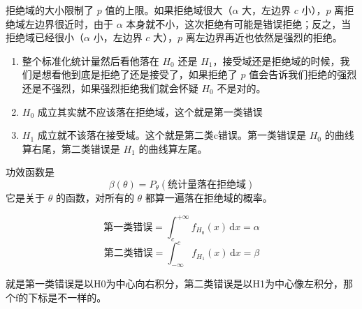 \begin{note}
    拒绝域的大小限制了 $p$ 值的上限。如果拒绝域很大（$\alpha$ 大，左边界 $c$ 小），$p$ 离拒绝域左边界很近时，由于 $\alpha$ 本身就不小，这次拒绝有可能是错误拒绝；反之，当拒绝域已经很小（$\alpha$ 小，左边界 $c$ 大），$p$ 离左边界再近也依然是强烈的拒绝。
\end{note}
\begin{dxtips}
    \begin{enumerate}
    \item[(1)] 整个标准化统计量然后看他落在 $H_0$ 还是 $H_1$，接受域还是拒绝域的时候，我们是想看他到底是拒绝了还是接受了，如果拒绝了 $p$ 值会告诉我们拒绝的强烈还是不强烈，如果强烈拒绝我们就会怀疑 $H_0$ 不是对的。
   \item $H_0$ 成立其实就不应该落在拒绝域，这个就是第一类错误
   \item $H_1$ 成立就不该落在接受域。这个就是第二类c错误。第一类错误是 $H_0$ 的曲线算右尾，第二类错误是 $H_1$ 的曲线算左尾。

\end{enumerate}
\end{dxtips}
    
\begin{note}
    功效函数是
$$\beta(\theta) = P_\theta(\text{统计量落在拒绝域})$$
它是关于 $\theta$ 的函数，对所有的 $\theta$ 都算一遍落在拒绝域的概率。
\end{note}
$$\text{第一类错误} = \int_c^{+\infty} f_{H_0}(x)\,\mathrm{d}x = \alpha$$
$$\text{第二类错误} = \int_{-\infty}^{c} f_{H_1}(x)\,\mathrm{d}x = \beta$$
\begin{dxtips}
    就是第一类错误是以H0为中心向右积分，第二类错误是以H1为中心像左积分，那个f的下标是不一样的。
\end{dxtips}
